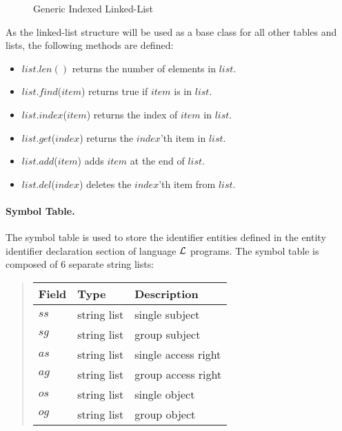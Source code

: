 \documentclass[10pt, twocolumn]{article}
\begin{document}
        \begin{figure}[ht]
          \begin{center}
            \caption{Generic Indexed Linked-List}
            \label{fig-2}
          \end{center}
        \end{figure}

        As the linked-list structure will be used as a base class for all other
        tables and lists, the following methods are defined:

        \begin{itemize}
          \item
            $list.len()$
            returns the number of elements in $list$.
          \item
            $list$.$find$($item$)
            returns true if $item$ is in $list$.
          \item
            $list$.$index$($item$)
            returns the index of $item$ in $list$.
          \item
            $list$.$get$($index$)
            returns the $index$'th item in $list$.
          \item
            $list$.$add$($item$)
            adds $item$ at the end of $list$.
          \item
            $list$.$del$($index$)
            deletes the $index$'th item from $list$.
        \end{itemize}

        \paragraph{Symbol Table.}

          The symbol table is used to store the identifier entities defined in
          the entity identifier declaration section of language ${\cal L}$
          programs. The symbol table is composed of 6 separate string lists:

          \begin{quote}
            \begin{tabular}[t]{|l|l|l|}
              \hline
              \textbf{Field} & \textbf{Type} & \textbf{Description} \\
              \hline
              $ss$ & string list & single subject \\
              \hline
              $sg$ & string list & group subject \\
              \hline
              $as$ & string list & single access right \\
              \hline
              $ag$ & string list & group access right \\
              \hline
              $os$ & string list & single object \\
              \hline
              $og$ & string list & group object \\
              \hline
            \end{tabular}
          \end{quote}
\end{document}
